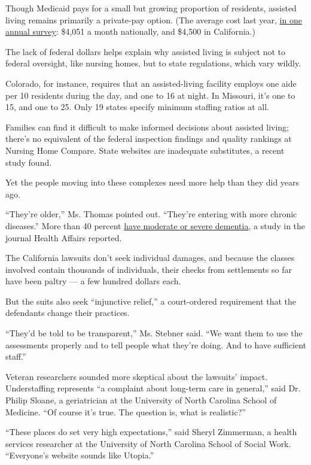 Though Medicaid pays for a small but growing proportion of residents,
assisted living remains primarily a private-pay option. (The average
cost last year,
\href{https://www.genworth.com/aging-and-you/finances/cost-of-care.html}{in
one annual survey}: \$4,051 a month nationally, and \$4,500 in
California.)

The lack of federal dollars helps explain why assisted living is subject
not to federal oversight, like nursing homes, but to state regulations,
which vary wildly.

Colorado, for instance, requires that an assisted-living facility
employs one aide per 10 residents during the day, and one to 16 at
night. In Missouri, it's one to 15, and one to 25. Only 19 states
specify minimum staffing ratios at all.

Families can find it difficult to make informed decisions about assisted
living; there's no equivalent of the federal inspection findings and
quality rankings at Nursing Home Compare. State websites are inadequate
substitutes, a recent study found.

Yet the people moving into these complexes need more help than they did
years ago.

``They're older,'' Ms. Thomas pointed out. ``They're entering with more
chronic diseases.'' More than 40 percent
\href{https://www.healthaffairs.org/doi/full/10.1377/hlthaff.2013.1255}{have
moderate or severe dementia}, a study in the journal Health Affairs
reported.

The California lawsuits don't seek individual damages, and because the
classes involved contain thousands of individuals, their checks from
settlements so far have been paltry --- a few hundred dollars each.

But the suits also seek ``injunctive relief,'' a court-ordered
requirement that the defendants change their practices.

``They'd be told to be transparent,'' Ms. Stebner said. ``We want them
to use the assessments properly and to tell people what they're doing.
And to have sufficient staff.''

Veteran researchers sounded more skeptical about the lawsuits' impact.
Understaffing represents ``a complaint about long-term care in
general,'' said Dr. Philip Sloane, a geriatrician at the University of
North Carolina School of Medicine. ``Of course it's true. The question
is, what is realistic?''

``These places do set very high expectations,'' said Sheryl Zimmerman, a
health services researcher at the University of North Carolina School of
Social Work. ``Everyone's website sounds like Utopia.''

